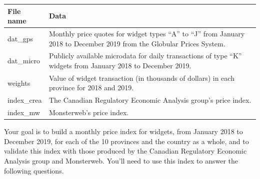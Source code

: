 \documentclass[]{article}
\begin{document}
\begin{longtable}[]{@{}ll@{}}
\toprule
\begin{minipage}[b]{0.47\columnwidth}\raggedright
File name\strut
\end{minipage} & \begin{minipage}[b]{0.47\columnwidth}\raggedright
Data\strut
\end{minipage}\tabularnewline
\midrule
\endhead
\begin{minipage}[t]{0.47\columnwidth}\raggedright
dat\_gps\strut
\end{minipage} & \begin{minipage}[t]{0.47\columnwidth}\raggedright
Monthly price quotes for widget types ``A'' to ``J'' from January 2018 to December 2019 from the Globular Prices System.\strut
\end{minipage}\tabularnewline
\begin{minipage}[t]{0.47\columnwidth}\raggedright
dat\_micro\strut
\end{minipage} & \begin{minipage}[t]{0.47\columnwidth}\raggedright
Publicly available microdata for daily transactions of type ``K'' widgets from January 2018 to December 2019.\strut
\end{minipage}\tabularnewline
\begin{minipage}[t]{0.47\columnwidth}\raggedright
weights\strut
\end{minipage} & \begin{minipage}[t]{0.47\columnwidth}\raggedright
Value of widget transaction (in thousands of dollars) in each province for 2018 and 2019.\strut
\end{minipage}\tabularnewline
\begin{minipage}[t]{0.47\columnwidth}\raggedright
index\_crea\strut
\end{minipage} & \begin{minipage}[t]{0.47\columnwidth}\raggedright
The Canadian Regulatory Economic Analysis group's price index.\strut
\end{minipage}\tabularnewline
\begin{minipage}[t]{0.47\columnwidth}\raggedright
index\_mw\strut
\end{minipage} & \begin{minipage}[t]{0.47\columnwidth}\raggedright
Monsterweb's price index.\strut
\end{minipage}\tabularnewline
\bottomrule
\end{longtable}

Your goal is to build a monthly price index for widgets, from January 2018 to December 2019, for each of the 10 provinces and the country as a whole, and to validate this index with those produced by the Canadian Regulatory Economic Analysis group and Monsterweb. You'll need to use this index to answer the following questions.
\end{document}
